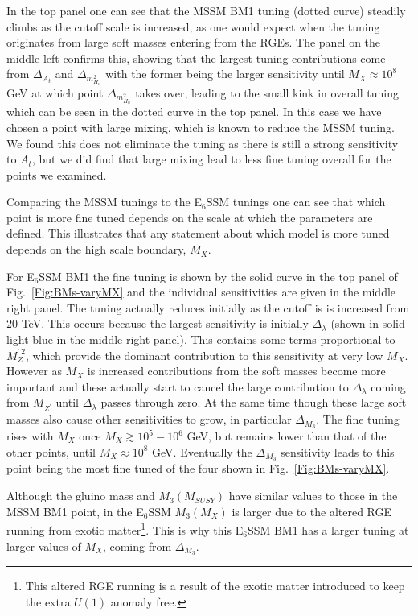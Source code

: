\documentclass[preprint,amsmath,amssymb,aps,superscriptaddress,prd,showpacs,floatfix,nofootinbib]{revtex4-1}
\begin{document}
In the top panel one can see that the MSSM BM1 tuning (dotted curve) 
steadily climbs as the cutoff scale is increased, as one would expect
when the tuning originates from large soft masses entering from the
RGEs. The panel on the middle left confirms this, showing that the
largest tuning contributions come from $\Delta_{A_t}$ and
$\Delta_{m_{H_u}^2}$ with the former being the larger sensitivity
until $M_X\approx 10^8$ GeV at which point $\Delta_{m_{H_u}^2}$ takes
over, leading to the small kink in overall tuning which can be seen in
the dotted curve in the top panel. In this case we have chosen a
point with large mixing, which is known to reduce the MSSM tuning.  We
found this does not eliminate the tuning as there is still a strong
sensitivity to $A_t$, but we did find that large mixing lead to less
fine tuning overall for the points we examined.  

Comparing the MSSM tunings to the E$_6$SSM tunings one can see that
which point is more fine tuned depends on the scale at which the
parameters are defined.  This illustrates that any statement about
which model is more tuned depends on the high scale boundary, $M_X$.

For E$_6$SSM BM1 the fine tuning is shown by the solid curve in the top
panel of Fig.~\ref{Fig:BMs-varyMX} and the individual sensitivities
are given in the middle right panel. The tuning actually reduces
initially as the cutoff is is increased from $20$ TeV.  This occurs
because the largest sensitivity is initially $\Delta_\lambda$ (shown
in solid light blue in the middle right panel).  This contains some terms
proportional to $M_Z^{\prime \, 2}$, which provide the dominant
contribution to this sensitivity at very low $M_X$.  However as $M_X$
is increased contributions from the soft masses become more important
and these actually start to cancel the large contribution to
$\Delta_\lambda$ coming from $M_{Z^\prime}$ until $\Delta_\lambda$
passes through zero.  At the same time though these large soft masses
also cause other sensitivities to grow, in particular $\Delta_{M_3}$.
The fine tuning rises with $M_X$ once $M_X \gtrsim 10^5-10^6$ GeV, but
remains lower than that of the other points, until $M_X \approx 10^8$
GeV.  Eventually the $\Delta_{M_3}$ sensitivity leads to this point
being the most fine tuned of the four shown in
Fig.~\ref{Fig:BMs-varyMX}.

 Although the gluino mass and $M_3(M_{SUSY})$ have similar values to
 those in the MSSM BM1 point, in the E$_6$SSM $M_3(M_X)$ is larger due
 to the altered RGE running from exotic matter\footnote{This altered
   RGE running is a result of the exotic matter introduced to keep the
   extra $U(1)$ anomaly free. }. This is why this E$_6$SSM BM1 has a
 larger tuning at larger values of $M_X$, coming from
 $\Delta_{M_3}$.
\end{document}
